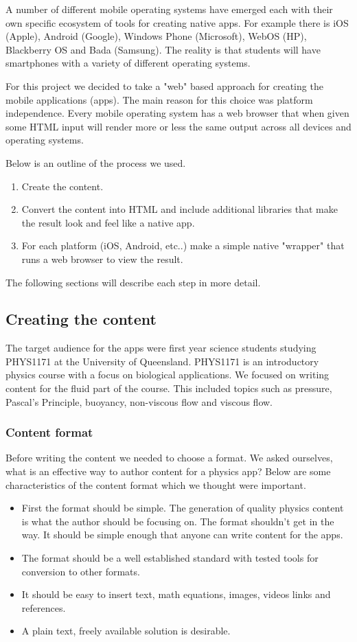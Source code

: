 \documentclass[12pt,a4paper]{article}  %
\begin{document}
A number of different mobile operating systems have emerged each with their own specific ecosystem of tools for creating native apps. For example there is iOS (Apple), Android (Google), Windows Phone (Microsoft), WebOS (HP), Blackberry OS and Bada (Samsung). The reality is that students will have smartphones with a variety of different operating systems.

For this project we decided to take a "web" based approach for creating the mobile applications (apps). The main reason for this choice was platform independence. Every mobile operating system has a web browser that when given some HTML input will render more or less the same output across all devices and operating systems.

Below is an outline of the process we used.
\begin{enumerate}
\item Create the content.
\item Convert the content into HTML and include additional libraries that make the result look and feel like a native app.
\item For each platform (iOS, Android, etc..) make a simple native "wrapper" that runs a web browser to view the result.
\end{enumerate}
The following sections will describe each step in more detail.

\subsection{Creating the content}

The target audience for the apps were first year science students studying PHYS1171 at the University of Queensland. PHYS1171 is an introductory physics course with a focus on biological applications. We focused on writing content for the fluid part of the course. This included topics such as pressure, Pascal's Principle, buoyancy, non-viscous flow and viscous flow.

\subsubsection{Content format}

Before writing the content we needed to choose a format. We asked ourselves, what is an effective way to author content for a physics app? Below are some characteristics of the content format which we thought were important.

\begin{itemize}
\item First the format should be simple. The generation of quality physics content is what the author should be focusing on. The format shouldn't get in the way. It should be simple enough that anyone can write content for the apps.
\item The format should be a well established standard with tested tools for conversion to other formats.
\item It should be easy to insert text, math equations, images, videos links and references.
\item A plain text, freely available solution is desirable.
\end{itemize}
\end{document}
